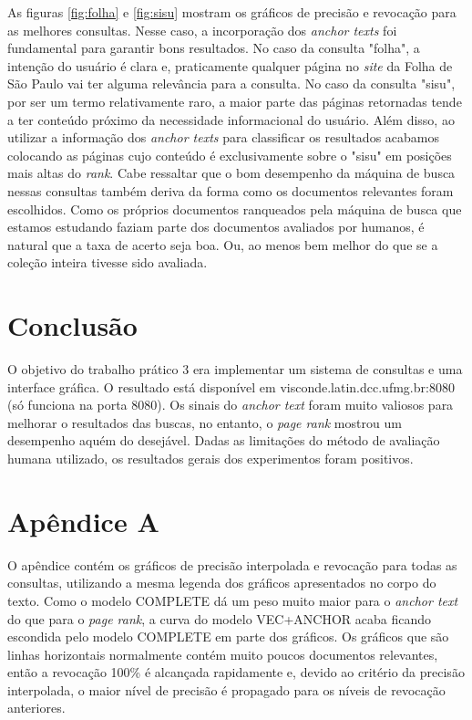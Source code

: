 \documentclass{article}
\begin{document}
As figuras \ref{fig:folha} e \ref{fig:sisu} mostram os gráficos de precisão e revocação para as melhores consultas. Nesse caso,
a incorporação dos \textit{anchor texts} foi fundamental para garantir bons resultados. No caso da consulta "folha", a intenção
do usuário é clara e, praticamente qualquer página no \textit{site} da Folha de São Paulo vai ter alguma relevância para a consulta.
No caso da consulta "sisu", por ser um termo relativamente raro, a maior parte das páginas retornadas tende a ter conteúdo próximo
da necessidade informacional do usuário. Além disso, ao utilizar a informação dos \textit{anchor texts} para classificar os resultados 
acabamos colocando as páginas cujo conteúdo é exclusivamente sobre o "sisu" em posições mais altas do \textit{rank}.
Cabe ressaltar que o bom desempenho
da máquina de busca nessas consultas também deriva da forma como os documentos relevantes foram escolhidos. Como os próprios 
documentos ranqueados pela máquina de busca que estamos estudando faziam parte dos documentos avaliados por humanos, é natural que a taxa de acerto 
seja boa. Ou, ao menos bem melhor do que se a coleção inteira tivesse sido avaliada.

\section{Conclusão}

O objetivo do trabalho prático 3 era implementar um sistema de consultas e uma interface gráfica. O resultado
está disponível em visconde.latin.dcc.ufmg.br:8080 (só funciona na porta 8080). Os sinais do
\textit{anchor text} foram muito valiosos para melhorar o resultados das buscas, no entanto,
o \textit{page rank} mostrou um desempenho aquém do desejável. Dadas as limitações do método de avaliação humana 
utilizado, os resultados gerais dos experimentos foram positivos.

\section{Apêndice A}

O apêndice contém os gráficos de precisão interpolada e revocação para todas as consultas, utilizando a mesma
legenda dos gráficos apresentados no corpo do texto. Como o modelo COMPLETE dá um peso muito maior para o \textit{anchor text}
do que para o \textit{page rank}, a curva do modelo VEC+ANCHOR acaba ficando escondida pelo modelo COMPLETE em parte dos gráficos.
Os gráficos que são linhas horizontais normalmente contém muito poucos documentos relevantes, então a revocação 100\% é alcançada
rapidamente e, devido ao critério da precisão interpolada, o maior nível de precisão é propagado para os níveis de revocação anteriores.
\end{document}

